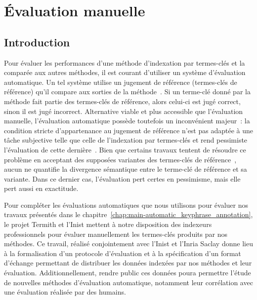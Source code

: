 \chapter{Évaluation manuelle}
\label{chap:main-manuelle_evaluation_of_keyphrase_annotation}

  \section{Introduction}
  \label{sec:main-automatic_evaluation_of_keyphrase_annotation-introduction}
    Pour évaluer les performances d'une méthode d'indexation par termes-clés et
    la comparée aux autres méthodes, il est courant d'utiliser un système
    d'évaluation automatique. Un tel système utilise un jugement de référence
    (termes-clés de référence) qu'il compare aux sorties de la
    méthode~\cite{voorhees2002philosophy}. Si un terme-clé donné par la méthode
    fait partie des termes-clés de référence, alors celui-ci est jugé correct,
    sinon il est jugé incorrect. Alternative viable et plus accessible que
    l'évaluation manuelle, l'évaluation automatique possède toutefois un
    inconvénient majeur~: la condition stricte d'appartenance au jugement de
    référence n'est pas adaptée à une tâche subjective telle que celle de
    l'indexation par termes-clés et rend pessimiste l'évaluation de cette
    dernière~\cite{hasan2014state_of_the_art}. Bien que certains travaux tentent
    de résoudre ce problème en acceptant des supposées variantes des termes-clés
    de référence~\cite{zesch2009rprecision,kim2010rprecision}, aucun ne
    quantifie la divergence sémantique entre le terme-clé de référence et sa
    variante. Dans ce dernier cas, l'évaluation pert certes en pessimisme, mais
    elle pert aussi en exactitude.
    
    Pour compléter les évaluations automatiques que nous utilisons pour évaluer
    nos travaux présentés dans le
    chapitre~\ref{chap:main-automatic_keyphrase_annotation}, le projet Termith
    et l'Inist mettent à notre disposition des indexeurs professionnels pour
    évaluer manuellement les termes-clés produits par nos méthodes. Ce travail,
    réalisé conjointement avec l'Inist et l'Inria Saclay donne lieu à la
    formalisation d'un protocole d'évaluation et à la spécification d'un format
    d'échange permettant de distribuer les données indexées par nos méthodes
    et leur évaluation. Additionnellement, rendre public ces données poura
    permettre l'étude de nouvelles méthodes d'évaluation automatique, notamment
    leur corrélation avec une évaluation réalisée par des humains.

